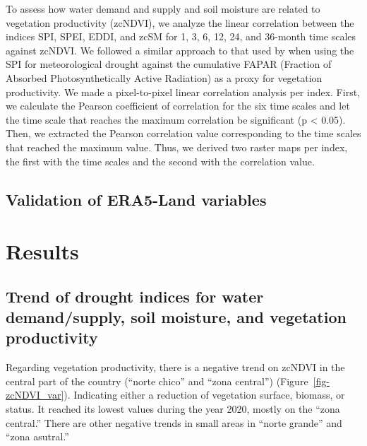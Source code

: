 \documentclass[
  number,
  preprint,
  3p,
  onecolumn]{elsarticle}
\begin{document}
To assess how water demand and supply and soil moisture are related to
vegetation productivity (zcNDVI), we analyze the linear correlation
between the indices SPI, SPEI, EDDI, and zcSM for 1, 3, 6, 12, 24, and
36-month time scales against zcNDVI. We followed a similar approach to
that used by \citep{Meroni2016} when using the SPI for meteorological
drought against the cumulative FAPAR (Fraction of Absorbed
Photosynthetically Active Radiation) as a proxy for vegetation
productivity. We made a pixel-to-pixel linear correlation analysis per
index. First, we calculate the Pearson coefficient of correlation for
the six time scales and let the time scale that reaches the maximum
correlation be significant (p \textless{} 0.05). Then, we extracted the
Pearson correlation value corresponding to the time scales that reached
the maximum value. Thus, we derived two raster maps per index, the first
with the time scales and the second with the correlation value.

\hypertarget{validation-of-era5-land-variables}{%
\subsection{Validation of ERA5-Land
variables}\label{validation-of-era5-land-variables}}

\hypertarget{results}{%
\section{Results}\label{results}}

\hypertarget{trend-of-drought-indices-for-water-demandsupply-soil-moisture-and-vegetation-productivity}{%
\subsection{Trend of drought indices for water demand/supply, soil
moisture, and vegetation
productivity}\label{trend-of-drought-indices-for-water-demandsupply-soil-moisture-and-vegetation-productivity}}

Regarding vegetation productivity, there is a negative trend on zcNDVI
in the central part of the country (``norte chico'' and ``zona
central'') (Figure~\ref{fig-zcNDVI_var}). Indicating either a reduction
of vegetation surface, biomass, or status. It reached its lowest values
during the year 2020, mostly on the ``zona central.'' There are other
negative trends in small areas in ``norte grande'' and ``zona asutral.''
\end{document}
